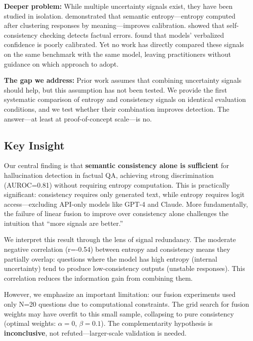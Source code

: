 \textbf{Deeper problem:} While multiple uncertainty signals exist, they have been studied in isolation. \citet{kuhn2023semantic} demonstrated that semantic entropy---entropy computed after clustering responses by meaning---improves calibration. \citet{manakul2023selfcheckgpt} showed that self-consistency checking detects factual errors. \citet{xiong2023can} found that models' verbalized confidence is poorly calibrated. Yet no work has directly compared these signals on the same benchmark with the same model, leaving practitioners without guidance on which approach to adopt.

\textbf{The gap we address:} Prior work assumes that combining uncertainty signals should help, but this assumption has not been tested. We provide the first systematic comparison of entropy and consistency signals on identical evaluation conditions, and we test whether their combination improves detection. The answer---at least at proof-of-concept scale---is no.

\subsection{Key Insight}

Our central finding is that \textbf{semantic consistency alone is sufficient} for hallucination detection in factual QA, achieving strong discrimination (AUROC=0.81) without requiring entropy computation. This is practically significant: consistency requires only generated text, while entropy requires logit access---excluding API-only models like GPT-4 and Claude. More fundamentally, the failure of linear fusion to improve over consistency alone challenges the intuition that ``more signals are better.''

We interpret this result through the lens of signal redundancy. The moderate negative correlation (r=-0.54) between entropy and consistency means they partially overlap: questions where the model has high entropy (internal uncertainty) tend to produce low-consistency outputs (unstable responses). This correlation reduces the information gain from combining them.

However, we emphasize an important limitation: our fusion experiments used only N=20 questions due to computational constraints. The grid search for fusion weights may have overfit to this small sample, collapsing to pure consistency (optimal weights: $\alpha=0$, $\beta=0.1$). The complementarity hypothesis is \textbf{inconclusive}, not refuted---larger-scale validation is needed.


